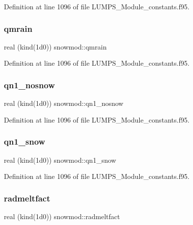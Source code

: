 Definition at line 1096 of file L\+U\+M\+P\+S\+\_\+\+Module\+\_\+constants.\+f95.

\mbox{\label{namespacesnowmod_a35fe883b6ebd9767f44c27354160afd3}} 
\subsubsection{\texorpdfstring{qmrain}{qmrain}}
{\footnotesize\ttfamily real (kind(1d0)) snowmod\+::qmrain}



Definition at line 1096 of file L\+U\+M\+P\+S\+\_\+\+Module\+\_\+constants.\+f95.

\mbox{\label{namespacesnowmod_adfca55100f9a2262f228ea1e39d61271}} 
\subsubsection{\texorpdfstring{qn1\+\_\+nosnow}{qn1\_nosnow}}
{\footnotesize\ttfamily real (kind(1d0)) snowmod\+::qn1\+\_\+nosnow}



Definition at line 1096 of file L\+U\+M\+P\+S\+\_\+\+Module\+\_\+constants.\+f95.

\mbox{\label{namespacesnowmod_ad0e97f4f3c91c80ab519eab77750a5c0}} 
\subsubsection{\texorpdfstring{qn1\+\_\+snow}{qn1\_snow}}
{\footnotesize\ttfamily real (kind(1d0)) snowmod\+::qn1\+\_\+snow}



Definition at line 1096 of file L\+U\+M\+P\+S\+\_\+\+Module\+\_\+constants.\+f95.

\mbox{\label{namespacesnowmod_abb043edcfd004e81969e16e07ed0d646}} 
\subsubsection{\texorpdfstring{radmeltfact}{radmeltfact}}
{\footnotesize\ttfamily real (kind(1d0)) snowmod\+::radmeltfact}



